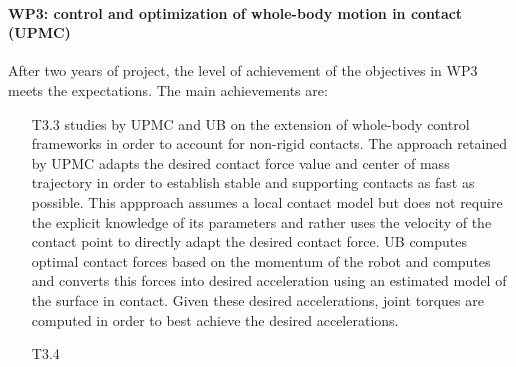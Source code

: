

 
\paragraph*{WP3: control and optimization of whole-body motion in contact (UPMC)}

After two years of project, the level of achievement of the objectives in WP3 meets the expectations. The main achievements are:
\begin{itemize}
\item[T3.3] studies by UPMC and UB on the extension of whole-body control frameworks in order to account for non-rigid contacts.  The approach retained by UPMC adapts the desired contact force value and center of mass trajectory in order to establish stable and supporting contacts as fast as possible. This appproach assumes a local contact model but does not require the explicit knowledge of its parameters and rather uses the velocity of the contact point to directly adapt the desired contact force. UB computes optimal contact forces based on the momentum of the robot and computes and converts this forces into desired acceleration using an estimated model of the surface in contact. Given these desired accelerations, joint torques are computed in order to best achieve the desired accelerations.
\item[T3.4] 
\end{itemize}



